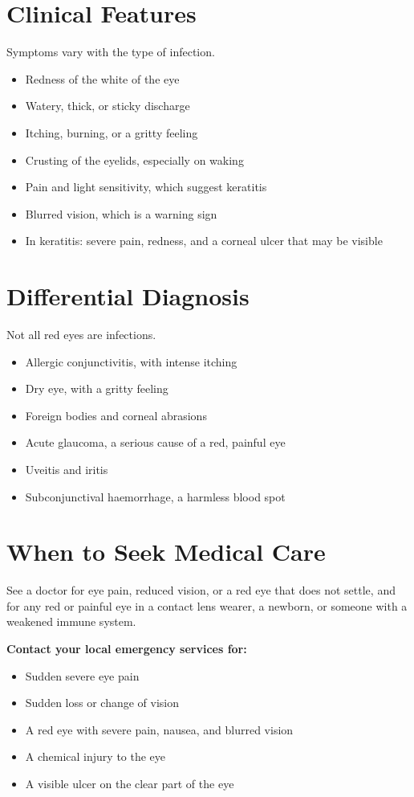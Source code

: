 \section*{Clinical Features}
Symptoms vary with the type of infection.
\begin{itemize}
    \item Redness of the white of the eye
    \item Watery, thick, or sticky discharge
    \item Itching, burning, or a gritty feeling
    \item Crusting of the eyelids, especially on waking
    \item Pain and light sensitivity, which suggest keratitis
    \item Blurred vision, which is a warning sign
    \item In keratitis: severe pain, redness, and a corneal ulcer that may be visible
\end{itemize}

\section*{Differential Diagnosis}
Not all red eyes are infections.
\begin{itemize}
    \item Allergic conjunctivitis, with intense itching
    \item Dry eye, with a gritty feeling
    \item Foreign bodies and corneal abrasions
    \item Acute glaucoma, a serious cause of a red, painful eye
    \item Uveitis and iritis
    \item Subconjunctival haemorrhage, a harmless blood spot
\end{itemize}

\section*{When to Seek Medical Care}
See a doctor for eye pain, reduced vision, or a red eye that does not settle, and for any red or painful eye in a contact lens wearer, a newborn, or someone with a weakened immune system.

\textbf{Contact your local emergency services for:}
\begin{itemize}
    \item Sudden severe eye pain
    \item Sudden loss or change of vision
    \item A red eye with severe pain, nausea, and blurred vision
    \item A chemical injury to the eye
    \item A visible ulcer on the clear part of the eye
\end{itemize}

